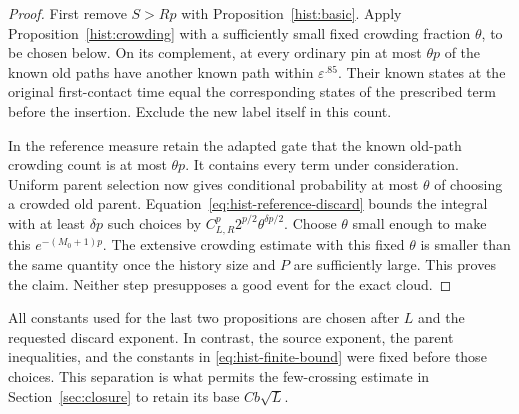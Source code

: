 \begin{proof}
First remove $S>Rp$ with Proposition~\ref{hist:basic}.  Apply
Proposition~\ref{hist:crowding} with a sufficiently small fixed
crowding fraction $\theta$, to be chosen below.  On its complement,
at every ordinary pin at most $\theta p$ of the known old paths
have another known path within $\varepsilon^{.85}$.  Their known
states at the original first-contact time equal the corresponding
states of the prescribed term before the insertion.  Exclude the
new label itself in this count.

In the reference measure retain the adapted gate that the known
old-path crowding count is at most $\theta p$.  It contains every
term under consideration.  Uniform parent selection now gives
conditional probability at most $\theta$ of choosing a crowded old
parent.  Equation~\eqref{eq:hist-reference-discard} bounds the
integral with at least $\delta p$ such choices by
$C_{L,R}^p2^{p/2}\theta^{\delta p/2}$.  Choose $\theta$ small enough
to make this $e^{-(M_0+1)p}$.  The extensive crowding estimate with
this fixed $\theta$ is smaller than the same quantity once the
history size and $P$ are sufficiently large.  This proves the
claim.  Neither step presupposes a good event for the exact cloud.
\end{proof}

All constants used for the last two propositions are chosen after
$L$ and the requested discard exponent.  In contrast, the source
exponent, the parent inequalities, and the constants in
\eqref{eq:hist-finite-bound} were fixed before those choices.  This
separation is what permits the few-crossing estimate in
Section~\ref{sec:closure} to retain its base $Cb\sqrt L$.
